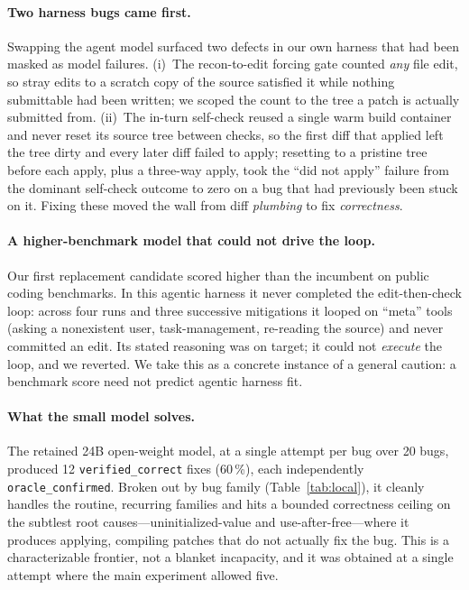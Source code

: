 \documentclass[11pt]{article}
\begin{document}
\paragraph{Two harness bugs came first.} Swapping the agent model surfaced two
defects in our own harness that had been masked as model failures. (i)~The
recon-to-edit forcing gate counted \emph{any} file edit, so stray edits to a
scratch copy of the source satisfied it while nothing submittable had been written;
we scoped the count to the tree a patch is actually submitted from. (ii)~The
in-turn self-check reused a single warm build container and never reset its source
tree between checks, so the first diff that applied left the tree dirty and every
later diff failed to apply; resetting to a pristine tree before each apply, plus a
three-way apply, took the ``did not apply'' failure from the dominant self-check
outcome to zero on a bug that had previously been stuck on it. Fixing these moved
the wall from diff \emph{plumbing} to fix \emph{correctness}.

\paragraph{A higher-benchmark model that could not drive the loop.} Our first
replacement candidate scored higher than the incumbent on public coding
benchmarks. In this agentic harness it never completed the edit-then-check loop:
across four runs and three successive mitigations it looped on ``meta'' tools
(asking a nonexistent user, task-management, re-reading the source) and never
committed an edit. Its stated reasoning was on target; it could not \emph{execute}
the loop, and we reverted. We take this as a concrete instance of a general
caution: a benchmark score need not predict agentic harness fit.

\paragraph{What the small model solves.} The retained 24B open-weight model, at a
single attempt per bug over 20 bugs, produced 12 \texttt{verified\_correct} fixes
(60\,\%), each independently \texttt{oracle\_confirmed}. Broken out by bug family
(Table~\ref{tab:local}), it cleanly handles the routine, recurring families and
hits a bounded correctness ceiling on the subtlest root causes---uninitialized-value
and use-after-free---where it produces applying, compiling patches that do not
actually fix the bug. This is a characterizable frontier, not a blanket
incapacity, and it was obtained at a single attempt where the main experiment
allowed five.
\end{document}
